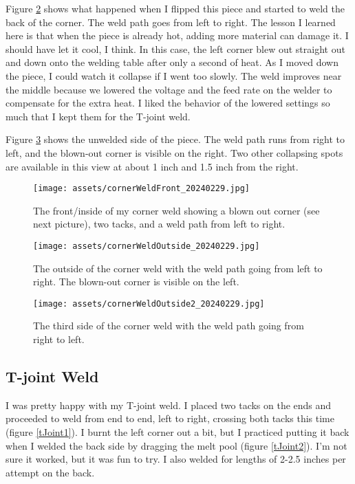 \documentclass{article}
\begin{document}
Figure \ref{corner2} shows what happened when I flipped this piece and started to weld the back of the corner. The weld path goes from left to right. The lesson I learned here is that when the piece is already hot, adding more material can damage it. I should have let it cool, I think. In this case, the left corner blew out straight out and down onto the welding table after only a second of heat. As I moved down the piece, I could watch it collapse if I went too slowly. The weld improves near the middle because we lowered the voltage and the feed rate on the welder to compensate for the extra heat. I liked the behavior of the lowered settings so much that I kept them for the T-joint weld.

Figure \ref{corner3} shows the unwelded side of the piece. The weld path runs from right to left, and the blown-out corner is visible on the right. Two other collapsing spots are available in this view at about 1 inch and 1.5 inch from the right.

\begin{figure}[h]
\caption{The front/inside of my corner weld showing a blown out corner (see next picture), two tacks, and a weld path from left to right.}
\texttt{[image: assets/cornerWeldFront\_20240229.jpg]}
\label{corner1}
\end{figure}

\begin{figure}[h]
\caption{The outside of the corner weld with the weld path going from left to right. The blown-out corner is visible on the left.}
\texttt{[image: assets/cornerWeldOutside\_20240229.jpg]}
\label{corner2}
\end{figure}

\begin{figure}[h]
\caption{The third side of the corner weld with the weld path going from right to left.}
\texttt{[image: assets/cornerWeldOutside2\_20240229.jpg]}
\label{corner3}
\end{figure}

\subsection*{T-joint Weld}

I was pretty happy with my T-joint weld. I placed two tacks on the ends and proceeded to weld from end to end, left to right, crossing both tacks this time (figure \ref{tJoint1}). I burnt the left corner out a bit, but I practiced putting it back when I welded the back side by dragging the melt pool (figure \ref{tJoint2}). I'm not sure it worked, but it was fun to try. I also welded for lengths of 2-2.5 inches per attempt on the back.
\end{document}
